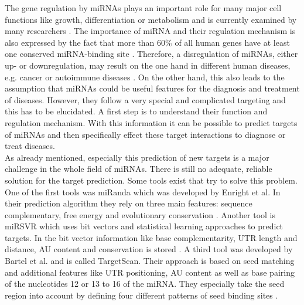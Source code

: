 \documentclass[11pt, a4paper, twoside]{book}
\begin{document}
The gene regulation by miRNAs plays an important role for many major cell functions like growth, differentiation or metabolism and is currently examined by many researchers \cite{Ardekani}. The importance of miRNA and their regulation mechanism is also expressed by the fact that more than 60\% of all human genes have at least one conserved miRNA-binding site \cite{Friedman}. Therefore, a disregulation of miRNAs, either up- or downregulation, may result on the one hand in different human diseases, e.g. cancer or autoimmune diseases \cite{Ardekani}. On the other hand, this also leads to the assumption that miRNAs could be useful features for the diagnosis and treatment of diseases. However, they follow a very special and complicated targeting and this has to be elucidated. A first step is to understand their function and regulation mechanism. With this information it can be possible to predict targets of miRNAs and then specifically effect these target interactions to diagnose or treat diseases. \\

As already mentioned, especially this prediction of new targets is a major challenge in the whole field of miRNAs. There is still no adequate, reliable solution for the target prediction. Some tools exist that try to solve this problem. One of the first tools was miRanda which was developed by Enright et al. In their prediction algorithm they rely on three main features: sequence complementary, free energy and evolutionary conservation \cite{Enright}. Another tool is miRSVR which uses bit vectors and statistical learning approaches to predict targets. In the bit vector information like base complementarity, UTR length and distance, AU content and conservation is stored \cite{Betel}. A third tool was developed by Bartel et al. and is called TargetScan. Their approach is based on seed matching and additional features like UTR positioning, AU content as well as base pairing of the nucleotides 12 or 13 to 16 of the miRNA. They especially take the seed region into account by defining four different patterns of seed binding sites \cite{Lewis}.\\
\end{document}
